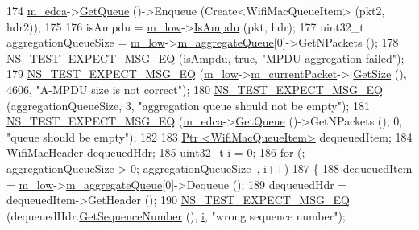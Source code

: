 \begin{DoxyCode}
174   \hyperlink{classAmpduAggregationTest_aa073b38b49ac92944de917cd25fe46f4}{m\_edca}->\hyperlink{classns3_1_1DcaTxop_a6c89d0aeccbc5e8724d404bc45f796d7}{GetQueue} ()->Enqueue (Create<WifiMacQueueItem> (pkt2, hdr2));
175 
176   isAmpdu = \hyperlink{classAmpduAggregationTest_a65f2d8fbd8b46a92ace2c371d2a091d9}{m\_low}->\hyperlink{classns3_1_1MacLow_a228f675a7db0df0e39edb611167861cc}{IsAmpdu} (pkt, hdr);
177   uint32\_t aggregationQueueSize = \hyperlink{classAmpduAggregationTest_a65f2d8fbd8b46a92ace2c371d2a091d9}{m\_low}->\hyperlink{classns3_1_1MacLow_a50ea30f5dff00a3ef2683b9275717c6f}{m\_aggregateQueue}[0]->GetNPackets ();
178   \hyperlink{group__testing_ga7304ba46a28d8cf08dfdfd6499cf7068}{NS\_TEST\_EXPECT\_MSG\_EQ} (isAmpdu, \textcolor{keyword}{true}, \textcolor{stringliteral}{"MPDU aggregation failed"});
179   \hyperlink{group__testing_ga7304ba46a28d8cf08dfdfd6499cf7068}{NS\_TEST\_EXPECT\_MSG\_EQ} (\hyperlink{classAmpduAggregationTest_a65f2d8fbd8b46a92ace2c371d2a091d9}{m\_low}->\hyperlink{classns3_1_1MacLow_aa4f81bb523ceed1bbf5a84851b25e29c}{m\_currentPacket}->
      \hyperlink{classns3_1_1Packet_a462855c9929954d4301a4edfe55f4f1c}{GetSize} (), 4606, \textcolor{stringliteral}{"A-MPDU size is not correct"});
180   \hyperlink{group__testing_ga7304ba46a28d8cf08dfdfd6499cf7068}{NS\_TEST\_EXPECT\_MSG\_EQ} (aggregationQueueSize, 3, \textcolor{stringliteral}{"aggregation queue should not be
       empty"});
181   \hyperlink{group__testing_ga7304ba46a28d8cf08dfdfd6499cf7068}{NS\_TEST\_EXPECT\_MSG\_EQ} (\hyperlink{classAmpduAggregationTest_aa073b38b49ac92944de917cd25fe46f4}{m\_edca}->\hyperlink{classns3_1_1DcaTxop_a6c89d0aeccbc5e8724d404bc45f796d7}{GetQueue} ()->GetNPackets (), 0, \textcolor{stringliteral}{"queue
       should be empty"});
182 
183   \hyperlink{classns3_1_1Ptr}{Ptr <WifiMacQueueItem>} dequeuedItem;
184   \hyperlink{classns3_1_1WifiMacHeader}{WifiMacHeader} dequeuedHdr;
185   uint32\_t \hyperlink{bernuolliDistribution_8m_a6f6ccfcf58b31cb6412107d9d5281426}{i} = 0;
186   \textcolor{keywordflow}{for} (; aggregationQueueSize > 0; aggregationQueueSize--, i++)
187     \{
188       dequeuedItem = \hyperlink{classAmpduAggregationTest_a65f2d8fbd8b46a92ace2c371d2a091d9}{m\_low}->\hyperlink{classns3_1_1MacLow_a50ea30f5dff00a3ef2683b9275717c6f}{m\_aggregateQueue}[0]->Dequeue ();
189       dequeuedHdr = dequeuedItem->GetHeader ();
190       \hyperlink{group__testing_ga7304ba46a28d8cf08dfdfd6499cf7068}{NS\_TEST\_EXPECT\_MSG\_EQ} (dequeuedHdr.\hyperlink{classns3_1_1WifiMacHeader_aa202a29c2d6aebe9b3d589e58cbd17bb}{GetSequenceNumber} (), 
      \hyperlink{bernuolliDistribution_8m_a6f6ccfcf58b31cb6412107d9d5281426}{i}, \textcolor{stringliteral}{"wrong sequence number"});

\end{DoxyCode}
